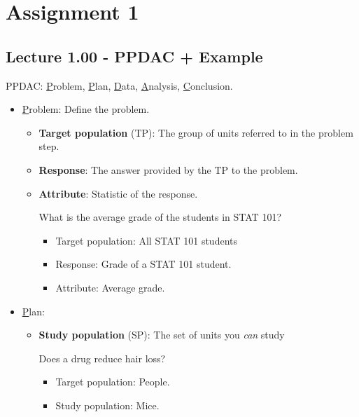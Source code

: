 \chapter{Assignment 1}
\section{Lecture 1.00 - PPDAC + Example}
PPDAC\@: \underline{P}roblem, \underline{P}lan, \underline{D}ata,
\underline{A}nalysis, \underline{C}onclusion.
\begin{itemize}
    \item \underline{P}roblem: Define the problem.
          \begin{itemize}
              \item \textbf{Target population} (TP): The group of units referred to in the problem step.
              \item \textbf{Response}: The answer provided by the TP to the problem.
              \item \textbf{Attribute}: Statistic of the response.
                    \begin{Example}{}{}
                        What is the average grade of the students in STAT 101?
                        \begin{itemize}
                            \item Target population: All STAT 101 students
                            \item Response: Grade of a STAT 101 student.
                            \item Attribute: Average grade.
                        \end{itemize}
                    \end{Example}
          \end{itemize}
    \item \underline{P}lan:
          \begin{itemize}
              \item \textbf{Study population} (SP): The set of units you \emph{can} study
                    \begin{Example}{}{}
                        Does a drug reduce hair loss?
                        \begin{itemize}
                            \item Target population: People.
                            \item Study population: Mice.
                        \end{itemize}

\end{Example}
\end{itemize}
\end{itemize}
